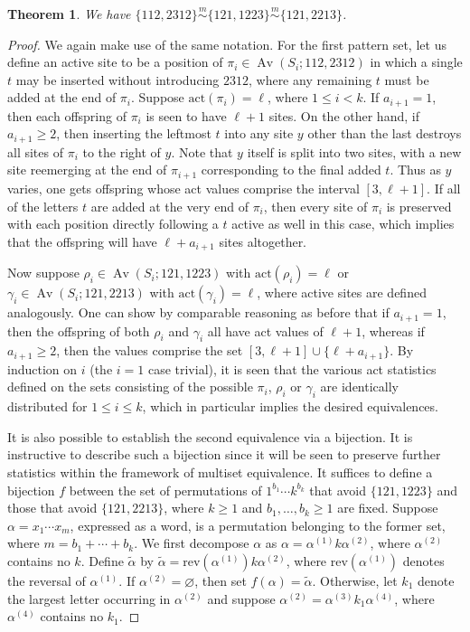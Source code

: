 \documentclass[11pt]{amsart}
\theoremstyle{plain}
\newtheorem{theorem}{Theorem}[section]
\theoremstyle{definition}
\newcommand{\csim}{\stackrel{m}{\sim}}
\DeclareMathOperator{\Av}{Av}
\begin{document}
\begin{theorem}\label{112,2312}
We have $\{112,2312\}\csim\{121,1223\}\csim\{121,2213\}$.
\end{theorem}
\begin{proof}
We again make use of the same notation.  For the first pattern set, let us define an active site to be a
position of $\pi_i \in \Av(S_i;112,2312)$ in which a single $t$ may be inserted without
introducing $2312$, where any remaining $t$ must be added at the end of $\pi_i$.  Suppose
$\text{act}(\pi_i)=\ell$, where $1 \leq i<k$.  If $a_{i+1}=1$, then each offspring of $\pi_i$ is seen
to have $\ell+1$ sites.  On the other hand, if $a_{i+1}\geq 2$, then inserting the leftmost $t$ into
any site $y$ other than the last destroys all sites of $\pi_i$ to the right of $y$.  Note that $y$
itself is split into two sites, with a new site reemerging at the end of $\pi_{i+1}$ corresponding to
the final added $t$.  Thus as $y$ varies, one gets offspring whose act values comprise the interval
$[3,\ell+1]$.  If all of the letters $t$ are added at the very end of $\pi_i$, then every site of $\pi_i$
is preserved with each position directly following a $t$ active as well in this case, which implies
that the offspring will have $\ell+a_{i+1}$ sites altogether.

Now suppose $\rho_i\in \Av(S_i;121,1223)$ with $\text{act}(\rho_i)=\ell$ or $\gamma_i\in
\Av(S_i;121,2213)$ with $\text{act}(\gamma_i)=\ell$, where active sites are defined analogously.
One can show by comparable reasoning as before that if $a_{i+1}=1$, then the offspring of both
$\rho_i$ and $\gamma_i$ all have act values of $\ell+1$, whereas if $a_{i+1}\geq 2$, then the values
comprise the set $[3,\ell+1]\cup\{\ell+a_{i+1}\}$.  By induction on $i$ (the $i=1$ case trivial), it
is seen that the various act statistics defined on the sets consisting of the possible $\pi_i$,
$\rho_i$ or $\gamma_i$ are identically distributed for $1 \leq i \leq k$, which in particular implies
the desired equivalences.

It is also possible to establish the second equivalence via a bijection.  It is instructive to
describe such a bijection since it will be seen to preserve further statistics within the framework
of multiset equivalence.  It suffices to define a bijection $f$ between the set of permutations of
$1^{b_1}\cdots k^{b_k}$ that avoid $\{121,1223\}$ and those that avoid $\{121,2213\}$, where $k \geq
1$ and $b_1,\ldots,b_k\geq 1$ are fixed.  Suppose $\alpha=x_1\cdots x_m$, expressed as a word, is a
permutation belonging to the former set, where $m=b_1+\cdots+b_k$.  We first decompose $\alpha$ as
$\alpha=\alpha^{(1)}k\alpha^{(2)}$, where $\alpha^{(2)}$ contains no $k$.  Define
$\widetilde{\alpha}$ by $\widetilde{\alpha}=\text{rev}(\alpha^{(1)})k\alpha^{(2)}$, where
$\text{rev}(\alpha^{(1)})$ denotes the reversal of $\alpha^{(1)}$.  If $\alpha^{(2)}=\varnothing$,
then set $f(\alpha)=\widetilde{\alpha}$.  Otherwise, let $k_1$ denote the largest letter occurring in
$\alpha^{(2)}$ and suppose $\alpha^{(2)}=\alpha^{(3)}k_1\alpha^{(4)}$, where $\alpha^{(4)}$ contains
no $k_1$.


\end{proof}
\end{document}
